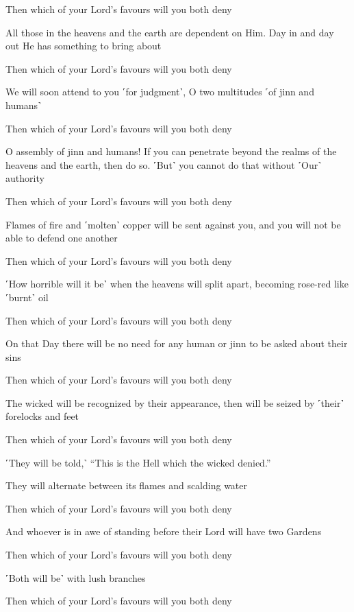 Then which of your Lord’s favours will you both deny

All those in the heavens and the earth are dependent on Him. Day in and day out He has something to bring about

Then which of your Lord’s favours will you both deny

We will soon attend to you ˹for judgment˺, O two multitudes ˹of jinn and humans˺

Then which of your Lord’s favours will you both deny

O assembly of jinn and humans! If you can penetrate beyond the realms of the heavens and the earth, then do so. ˹But˺ you cannot do that without ˹Our˺ authority

Then which of your Lord’s favours will you both deny

Flames of fire and ˹molten˺ copper will be sent against you, and you will not be able to defend one another

Then which of your Lord’s favours will you both deny

˹How horrible will it be˺ when the heavens will split apart, becoming rose-red like ˹burnt˺ oil

Then which of your Lord’s favours will you both deny

On that Day there will be no need for any human or jinn to be asked about their sins

Then which of your Lord’s favours will you both deny

The wicked will be recognized by their appearance, then will be seized by ˹their˺ forelocks and feet

Then which of your Lord’s favours will you both deny

˹They will be told,˺ “This is the Hell which the wicked denied.”

They will alternate between its flames and scalding water

Then which of your Lord’s favours will you both deny

And whoever is in awe of standing before their Lord will have two Gardens

Then which of your Lord’s favours will you both deny

˹Both will be˺ with lush branches

Then which of your Lord’s favours will you both deny

